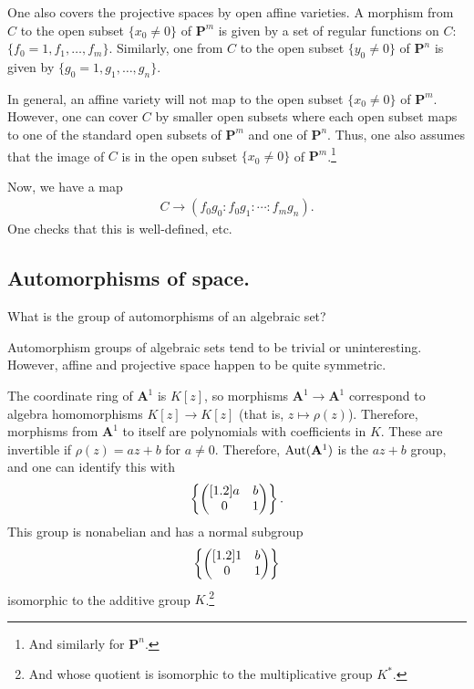 \documentclass [11 pt, oneside] {article}
\begin{document}
One also covers the projective spaces by open affine varieties. A morphism from $C$ to the open subset $\{x_0\ne 0\}$ of $\mathbf{P}^m$ is given by a set of regular functions on $C$: $\{f_0=1,f_1,\hdots, f_m\}$. Similarly, one from $C$ to the open subset $\{y_0\ne 0\}$ of $\mathbf{P}^n$ is given by $\{g_0=1,g_1,\hdots, g_n\}$. 

In general, an affine variety will not map to the open subset $\{x_0\ne 0\}$ of $\mathbf{P}^m$. However, one can cover $C$ by smaller open subsets where each open subset maps to one of the standard open subsets of $\mathbf{P}^m$ and one of $\mathbf{P}^n$. Thus, one also assumes that the image of $C$ is in the open subset $\{x_0\ne 0\}$ of $\mathbf{P}^m$.\footnote{And similarly for $\mathbf{P}^n$.}

Now, we have a map 
\begin{align*}
	C\longrightarrow (f_0g_0:f_0g_1:\cdots:f_mg_n).
\end{align*}
One checks that this is well-defined, etc.

\subsection{Automorphisms of space.}
\begin{problem}
	What is the group of automorphisms of an algebraic set?
\end{problem}

Automorphism groups of algebraic sets tend to be trivial or uninteresting. However, affine and projective space happen to be quite symmetric.

\begin{example}\label{}
The coordinate ring of $\mathbf{A}^1$ is $K[z]$, so morphisms $\mathbf{A}^1\longrightarrow \mathbf{A}^1$ correspond to algebra homomorphisms $K[z]\longrightarrow K[z]$ (that is, $z\longmapsto \rho(z)$). Therefore, morphisms from $\mathbf{A}^1$ to itself are polynomials with coefficients in $K$. These are invertible if $\rho(z) = az+b$ for $a\ne 0$. Therefore, $\operatorname{Aut}(\mathbf{A}^1)$ is the $az+b$ group, and one can identify this with
\begin{align*}
	\left\{ \begin{pmatrix} [1.2] a&b\\0&1\end{pmatrix} \right\}. 
\end{align*}
This group is nonabelian and has a normal subgroup 
\begin{align*}
	\left\{\begin{pmatrix} [1.2]  1&b\\0&1\end{pmatrix} \right\} 
\end{align*}
isomorphic to the additive group $K$.\footnote{And whose quotient is isomorphic to the multiplicative group $K^*$.}
\end{example}
\end{document}
